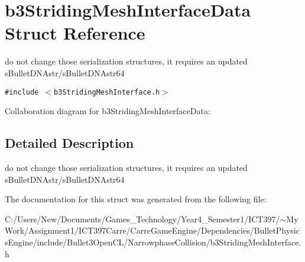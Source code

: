 \hypertarget{structb3_striding_mesh_interface_data}{
\section{b3StridingMeshInterfaceData Struct Reference}
\label{structb3_striding_mesh_interface_data}
}
do not change those serialization structures, it requires an updated sBulletDNAstr/sBulletDNAstr64  


{\tt \#include $<$b3StridingMeshInterface.h$>$}

Collaboration diagram for b3StridingMeshInterfaceData:

\subsection{Detailed Description}
do not change those serialization structures, it requires an updated sBulletDNAstr/sBulletDNAstr64 

The documentation for this struct was generated from the following file:\begin{CompactItemize}
\item 
C:/Users/New/Documents/Games\_\-Technology/Year4\_\-Semester1/ICT397/$\sim$My Work/Assignment1/ICT397Carre/CarreGameEngine/Dependencies/BulletPhysicsEngine/include/Bullet3OpenCL/NarrowphaseCollision/b3StridingMeshInterface.h\end{CompactItemize}
